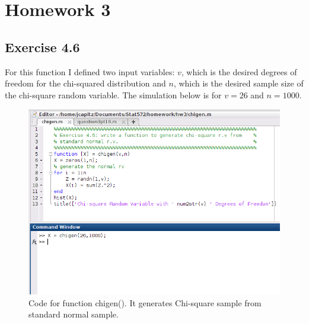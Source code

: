 \documentclass[12pt,a4paper]{article}
\begin{document}
\section*{Homework 3}

\subsection*{Exercise 4.6}

For this function I defined two input variables: $v$, which is the desired degrees of freedom for the chi-squared distribution and $n$, which is the desired sample size of the chi-square random variable. The simulation below is for $v=26$ and $n=1000$.
\begin{figure}[ht!]
\begin{center}
\includegraphics[scale=.70]{q4pt6_code.png}
\caption{Code for function chigen(). It generates Chi-square sample from standard normal sample.}
\label{q4pt6fig1}
\end{center}
\end{figure}
\FloatBarrier
\end{document}
